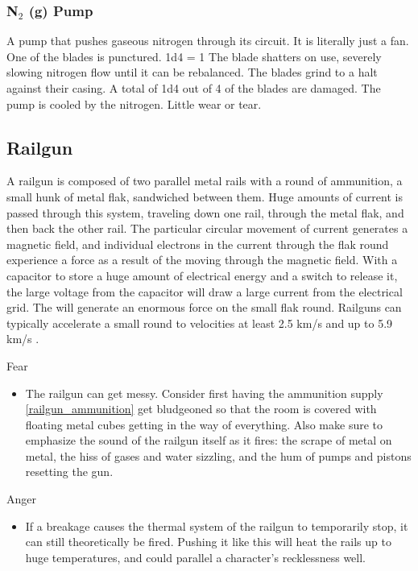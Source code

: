 \documentclass[a4paper]{article}
\begin{document}
\vspace{-0.5cm} \hspace{-18pt} \subsubsection{N$_2$ (g) Pump} \label{thermal_n2_pump} \vspace{-0.2cm}
A pump that pushes gaseous nitrogen through its circuit. It is literally just a fan.
\\ \pbhw
{One of the blades is punctured. \newline 1d4 = 1 The blade shatters on use, severely slowing nitrogen flow until it can be rebalanced.}
{The blades grind to a halt against their casing. A total of 1d4 out of 4 of the blades are damaged.}
{The pump is cooled by the nitrogen.}
{Little wear or tear.}


\newpage
\subsection{Railgun} \label{railgun}

A railgun is composed of two parallel metal rails with a round of ammunition, a small hunk of metal flak, sandwiched between them. Huge amounts of current is passed through this system, traveling down one rail, through the metal flak, and then back the other rail. The particular circular movement of current generates a magnetic field, and individual electrons in the current through the flak round experience a force as a result of the moving through the magnetic field. With a capacitor to store a huge amount of electrical energy and a switch to release it, the large voltage from the capacitor will draw a large current from the electrical grid. The will generate an enormous force on the small flak round. Railguns can typically accelerate a small round to velocities at least 2.5 km/s \cite{naval_railgun} and up to 5.9 km/s \cite{scientific_railgun}.

\vspace{0.3cm}
\begin{minipage}[t]{0.4\linewidth}
Fear
\begin{itemize}
\item The railgun can get messy. Consider first having the ammunition supply \ref{railgun_ammunition} get bludgeoned so that the room is covered with floating metal cubes getting in the way of everything. Also make sure to emphasize the sound of the railgun itself as it fires: the scrape of metal on metal, the hiss of gases and water sizzling, and the hum of pumps and pistons resetting the gun.
\end{itemize}
\end{minipage} 
\begin{minipage}[t]{0.4\linewidth}
Anger
\begin{itemize}
\item If a breakage causes the thermal system of the railgun to temporarily stop, it can still theoretically be fired. Pushing it like this will heat the rails up to huge temperatures, and could parallel a character's recklessness well.
\end{itemize}
\end{minipage}
\end{document}
